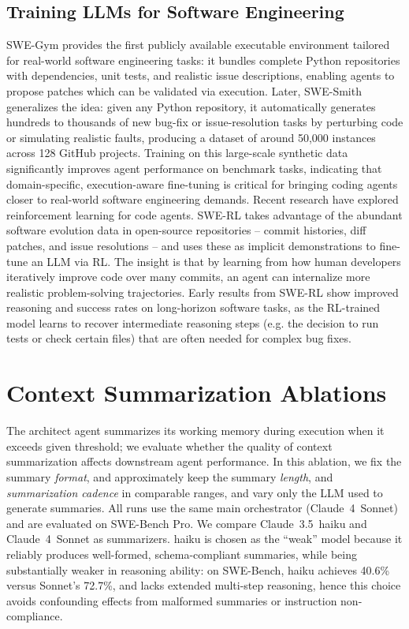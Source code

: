 \subsection{Training LLMs for Software Engineering} 
SWE-Gym \citep{pan2024training} provides the first publicly available executable environment tailored for real-world software engineering tasks: it bundles complete Python repositories with dependencies, unit tests, and realistic issue descriptions, enabling agents to propose patches which can be validated via execution. Later, SWE-Smith \citep{yang2025swesmith} generalizes the idea: given any Python repository, it automatically generates hundreds to thousands of new bug-fix or issue-resolution tasks by perturbing code or simulating realistic faults, producing a dataset of around 50,000 instances across 128 GitHub projects. Training on this large-scale synthetic data significantly improves agent performance on benchmark tasks, indicating that domain-specific, execution-aware fine-tuning is critical for bringing coding agents closer to real-world software engineering demands.
Recent research have explored reinforcement learning for code agents. SWE-RL \citep{wei2025swe} takes advantage of the abundant software evolution data in open-source repositories – commit histories, diff patches, and issue resolutions – and uses these as implicit demonstrations to fine-tune an LLM via RL. The insight is that by learning from how human developers iteratively improve code over many commits, an agent can internalize more realistic problem-solving trajectories. Early results from SWE-RL show improved reasoning and success rates on long-horizon software tasks, as the RL-trained model learns to recover intermediate reasoning steps (e.g. the decision to run tests or check certain files) that are often needed for complex bug fixes.




\section{Context Summarization Ablations}
\label{app:context}
The architect agent summarizes its working memory during execution when it exceeds given threshold; we evaluate whether the quality of context summarization affects downstream agent performance.
In this ablation, we fix the summary \emph{format}, and approximately keep the summary \emph{length}, and \emph{summarization cadence} in comparable ranges, and vary only the LLM used to generate summaries.
All runs use the same main orchestrator (Claude~4~Sonnet) and are evaluated on SWE-Bench Pro.
We compare Claude~3.5~haiku and Claude~4~Sonnet as summarizers.
haiku is chosen as the ``weak'' model because it reliably produces well-formed, schema-compliant summaries, while being substantially weaker in reasoning ability: on SWE-Bench, haiku achieves 40.6\% versus Sonnet’s 72.7\%, and lacks extended multi-step reasoning, hence this choice avoids confounding effects from malformed summaries or instruction non-compliance.

